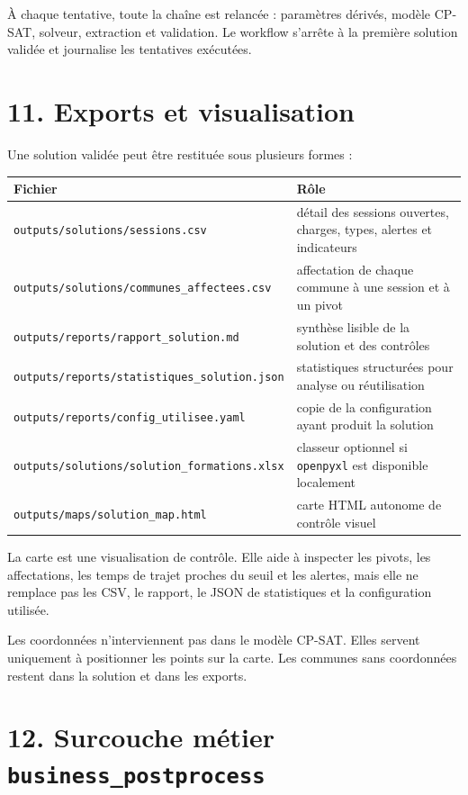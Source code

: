 \documentclass[11pt,a4paper]{article}
\begin{document}
À chaque tentative, toute la chaîne est relancée : paramètres dérivés, modèle CP-SAT, solveur, extraction et validation. Le workflow s'arrête à la première solution validée et journalise les tentatives exécutées.

\section{11. Exports et visualisation}

Une solution validée peut être restituée sous plusieurs formes :

\begin{longtable}{|L{0.34\textwidth}|L{0.56\textwidth}|}
\hline
Fichier & Rôle \\
\hline
\endhead
\texttt{outputs/solutions/sessions.csv} & détail des sessions ouvertes, charges, types, alertes et indicateurs \\
\hline
\texttt{outputs/solutions/communes\_affectees.csv} & affectation de chaque commune à une session et à un pivot \\
\hline
\texttt{outputs/reports/rapport\_solution.md} & synthèse lisible de la solution et des contrôles \\
\hline
\texttt{outputs/reports/statistiques\_solution.json} & statistiques structurées pour analyse ou réutilisation \\
\hline
\texttt{outputs/reports/config\_utilisee.yaml} & copie de la configuration ayant produit la solution \\
\hline
\texttt{outputs/solutions/solution\_formations.xlsx} & classeur optionnel si \texttt{openpyxl} est disponible localement \\
\hline
\texttt{outputs/maps/solution\_map.html} & carte HTML autonome de contrôle visuel \\
\hline
\end{longtable}

La carte est une visualisation de contrôle. Elle aide à inspecter les pivots, les affectations, les temps de trajet proches du seuil et les alertes, mais elle ne remplace pas les CSV, le rapport, le JSON de statistiques et la configuration utilisée.

Les coordonnées n'interviennent pas dans le modèle CP-SAT. Elles servent uniquement à positionner les points sur la carte. Les communes sans coordonnées restent dans la solution et dans les exports.

\section{12. Surcouche métier \texttt{business\_postprocess}}
\end{document}
